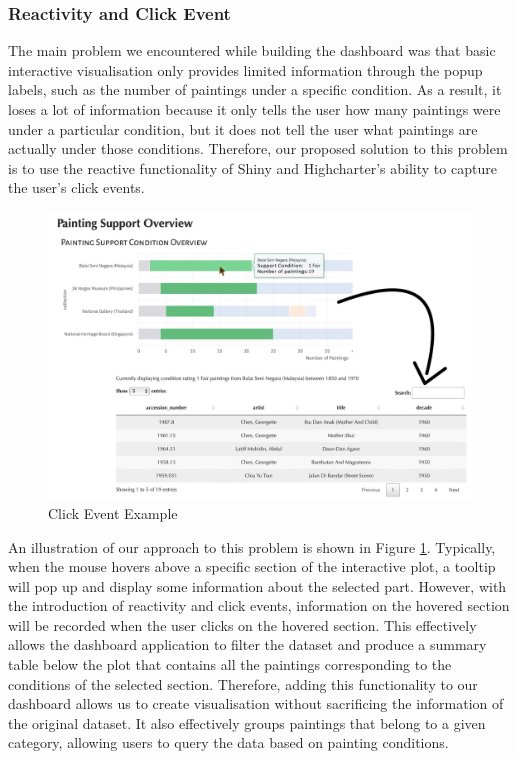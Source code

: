 \documentclass[11pt, oneside]{article}
\begin{document}
\subsubsection{Reactivity and Click Event}
The main problem we encountered while building the dashboard was that basic interactive visualisation only provides limited information through the popup labels, such as the number of paintings under a specific condition. As a result, it loses a lot of information because it only tells the user how many paintings were under a particular condition, but it does not tell the user what paintings are actually under those conditions. Therefore, our proposed solution to this problem is to use the reactive functionality of Shiny and Highcharter's ability to capture the user's click events.
\begin{figure}[H]
    \centering
    \includegraphics[scale=0.2]{images/click_event.jpeg}
    \caption{Click Event Example}
    \label{click_event}
\end{figure}
\noindent An illustration of our approach to this problem is shown in Figure \ref{click_event}. Typically, when the mouse hovers above a specific section of the interactive plot, a tooltip will pop up and display some information about the selected part. However, with the introduction of reactivity and click events, information on the hovered section will be recorded when the user clicks on the hovered section. This effectively allows the dashboard application to filter the dataset and produce a summary table below the plot that contains all the paintings corresponding to the conditions of the selected section. Therefore, adding this functionality to our dashboard allows us to create visualisation without sacrificing the information of the original dataset. It also effectively groups paintings that belong to a given category, allowing users to query the data based on painting conditions.
\end{document}
